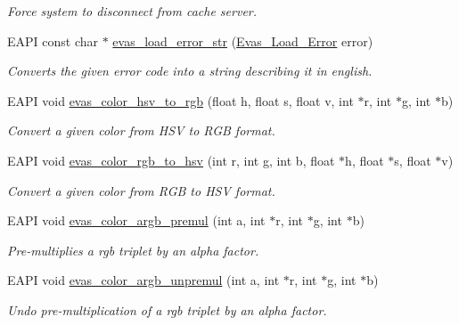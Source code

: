 \begin{DoxyCompactItemize}
\begin{DoxyCompactList}\small\item\em Force system to disconnect from cache server. \item\end{DoxyCompactList}\item 
EAPI const char $\ast$ \hyperlink{group__Evas__Utils_ga50bb423e88ce97cf82cca9b316fc7a1a}{evas\_\-load\_\-error\_\-str} (\hyperlink{Evas_8h_aff351ae694a58aecd7834ef12bdf3d64}{Evas\_\-Load\_\-Error} error)
\begin{DoxyCompactList}\small\item\em Converts the given error code into a string describing it in english. \item\end{DoxyCompactList}\item 
EAPI void \hyperlink{group__Evas__Utils_ga2a28c2e6ecdc72189040ae3f5bd829d0}{evas\_\-color\_\-hsv\_\-to\_\-rgb} (float h, float s, float v, int $\ast$r, int $\ast$g, int $\ast$b)
\begin{DoxyCompactList}\small\item\em Convert a given color from HSV to RGB format. \item\end{DoxyCompactList}\item 
EAPI void \hyperlink{group__Evas__Utils_ga4054acb14873d5923306ddde5537171d}{evas\_\-color\_\-rgb\_\-to\_\-hsv} (int r, int g, int b, float $\ast$h, float $\ast$s, float $\ast$v)
\begin{DoxyCompactList}\small\item\em Convert a given color from RGB to HSV format. \item\end{DoxyCompactList}\item 
EAPI void \hyperlink{group__Evas__Utils_ga892ffc2ac011e24a141816e0c72f7dfa}{evas\_\-color\_\-argb\_\-premul} (int a, int $\ast$r, int $\ast$g, int $\ast$b)
\begin{DoxyCompactList}\small\item\em Pre-\/multiplies a rgb triplet by an alpha factor. \item\end{DoxyCompactList}\item 
EAPI void \hyperlink{group__Evas__Utils_ga520b64aa41b81e13bf7fc9f16fd2f3e5}{evas\_\-color\_\-argb\_\-unpremul} (int a, int $\ast$r, int $\ast$g, int $\ast$b)
\begin{DoxyCompactList}\small\item\em Undo pre-\/multiplication of a rgb triplet by an alpha factor. \item\end{DoxyCompactList}\item 

\end{DoxyCompactItemize}
